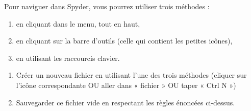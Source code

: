 Pour naviguer dans Spyder, vous pourrez utiliser trois m\' ethodes :
\begin{enumerate}
\item en cliquant dans le menu, tout en haut,
\item en cliquant sur la barre d'outils (celle qui contient les petites ic\^ ones),
\item en utilisant les raccourcis clavier.
\end{enumerate}

\begin{exercice} 

\begin{enumerate}
\item Cr\' eer un nouveau fichier en utilisant l'une des trois m\' ethodes (cliquer sur l'ic\^ one correspondante OU aller dans « fichier » OU taper « Ctrl N »)
\item Sauvegarder ce fichier vide en respectant les r\` egles \' enonc\' ees ci-dessus.
\end{enumerate}
\end{exercice}


